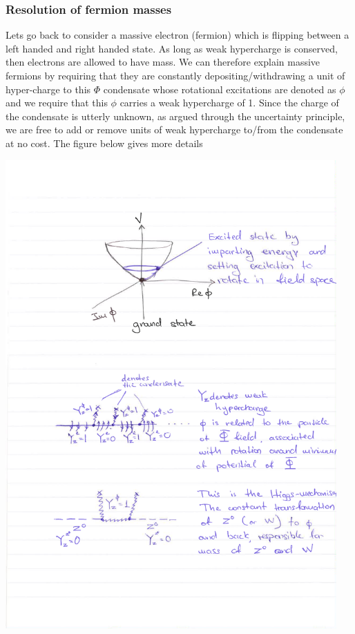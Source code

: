 \subsubsection{Resolution of fermion masses}
Lets go back to consider a massive electron (fermion) which is flipping between a left handed and right handed state. As long as weak hypercharge is conserved, then electrons are allowed to have mass. We can therefore explain massive fermions by requiring that they are constantly depositing/withdrawing a unit of hyper-charge to this $\Phi$ condensate whose rotational excitations are denoted as $\phi$ and we require that this $\phi$ carries a weak hypercharge of 1. Since the charge of the condensate is utterly unknown, as argued through the uncertainty principle, we are free to add or remove units of weak hypercharge to/from the condensate at no cost. The figure below gives more details
\begin{center}
\includegraphics[width=0.95\textwidth]{fig/higgs/fermion_mass.pdf}
\end{center}

